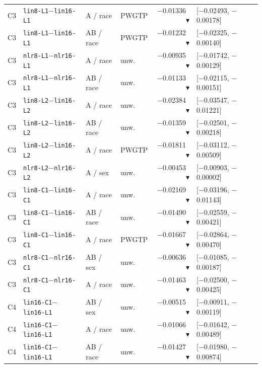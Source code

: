 \begin{tabular}{@{}llllrl@{}}
C3 & \texttt{lin8-L1}$-$\texttt{lin16-L1} & A / race & PWGTP & $-$0.01336~$\blacktriangledown$ & [$-$0.02493, $-$0.00178] \\
C3 & \texttt{lin8-L1}$-$\texttt{lin16-L1} & AB / race & PWGTP & $-$0.01232~$\blacktriangledown$ & [$-$0.02325, $-$0.00140] \\
C3 & \texttt{nlr8-L1}$-$\texttt{nlr16-L1} & A / race & unw. & $-$0.00935~$\blacktriangledown$ & [$-$0.01742, $-$0.00129] \\
C3 & \texttt{nlr8-L1}$-$\texttt{nlr16-L1} & AB / race & unw. & $-$0.01133~$\blacktriangledown$ & [$-$0.02115, $-$0.00151] \\
C3 & \texttt{lin8-L2}$-$\texttt{lin16-L2} & A / race & unw. & $-$0.02384~$\blacktriangledown$ & [$-$0.03547, $-$0.01221] \\
C3 & \texttt{lin8-L2}$-$\texttt{lin16-L2} & AB / race & unw. & $-$0.01359~$\blacktriangledown$ & [$-$0.02501, $-$0.00218] \\
C3 & \texttt{lin8-L2}$-$\texttt{lin16-L2} & A / race & PWGTP & $-$0.01811~$\blacktriangledown$ & [$-$0.03112, $-$0.00509] \\
C3 & \texttt{nlr8-L2}$-$\texttt{nlr16-L2} & A / sex & unw. & $-$0.00453~$\blacktriangledown$ & [$-$0.00903, $-$0.00002] \\
C3 & \texttt{lin8-C1}$-$\texttt{lin16-C1} & A / race & unw. & $-$0.02169~$\blacktriangledown$ & [$-$0.03196, $-$0.01143] \\
C3 & \texttt{lin8-C1}$-$\texttt{lin16-C1} & AB / race & unw. & $-$0.01490~$\blacktriangledown$ & [$-$0.02559, $-$0.00421] \\
C3 & \texttt{lin8-C1}$-$\texttt{lin16-C1} & A / race & PWGTP & $-$0.01667~$\blacktriangledown$ & [$-$0.02864, $-$0.00470] \\
C3 & \texttt{nlr8-C1}$-$\texttt{nlr16-C1} & AB / sex & unw. & $-$0.00636~$\blacktriangledown$ & [$-$0.01085, $-$0.00187] \\
C3 & \texttt{nlr8-C1}$-$\texttt{nlr16-C1} & A / race & unw. & $-$0.01463~$\blacktriangledown$ & [$-$0.02500, $-$0.00425] \\
C4 & \texttt{lin16-C1}$-$\texttt{lin16-L1} & AB / sex & unw. & $-$0.00515~$\blacktriangledown$ & [$-$0.00911, $-$0.00119] \\
C4 & \texttt{lin16-C1}$-$\texttt{lin16-L1} & A / race & unw. & $-$0.01066~$\blacktriangledown$ & [$-$0.01642, $-$0.00489] \\
C4 & \texttt{lin16-C1}$-$\texttt{lin16-L1} & AB / race & unw. & $-$0.01427~$\blacktriangledown$ & [$-$0.01980, $-$0.00874] \\

\end{tabular}
